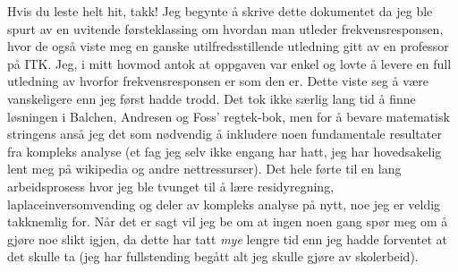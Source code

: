 \documentclass{article}
\begin{document}
Hvis du leste helt hit, takk! Jeg begynte å skrive dette dokumentet da jeg ble spurt av en uvitende førsteklassing om hvordan man utleder frekvensresponsen, hvor de også viste meg en ganske utilfredsstillende utledning gitt av en professor på ITK.
Jeg, i mitt hovmod antok at oppgaven var enkel og lovte å levere en full utledning av hvorfor frekvensresponsen er som den er. Dette viste seg å være vanskeligere enn jeg først hadde trodd. Det tok ikke særlig lang tid å finne løsningen i Balchen, Andresen og Foss' regtek-bok, men for å bevare matematisk stringens anså jeg det som nødvendig å inkludere noen fundamentale resultater fra kompleks analyse (et fag jeg selv ikke engang har hatt, jeg har hovedsakelig lent meg på wikipedia og andre nettressurser).
Det hele førte til en lang arbeidsprosess hvor jeg ble tvunget til å lære residyregning, laplaceinversomvending og deler av kompleks analyse på nytt, noe jeg er veldig takknemlig for. Når det er sagt vil jeg be om at ingen noen gang spør meg om å gjøre noe slikt igjen, da dette har tatt \textit{mye} lengre tid enn jeg hadde forventet at det skulle ta (jeg har fullstending begått alt jeg skulle gjøre av skolerbeid).
\end{document}
